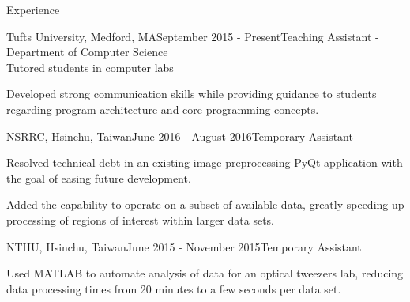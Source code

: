 \documentclass{resume} %
\begin{document}

\begin{rSection}{Experience}


\begin{rSubsection}{Tufts University, Medford, MA}{September 2015 -
    Present}{Teaching Assistant - Department of Computer Science\\
    Tutored students in computer labs}

\item Developed strong communication skills while providing guidance to
    students regarding program architecture and core programming concepts.

\end{rSubsection}

\begin{rSubsection}{NSRRC, Hsinchu, Taiwan}{June 2016 - August 2016}{Temporary
    Assistant}

\item Resolved technical debt in an existing image preprocessing PyQt
    application with the goal of easing future development.

\item Added the capability to operate on a subset of available data, greatly
    speeding up processing of regions of interest within larger data sets.

\end{rSubsection}

\begin{rSubsection}{NTHU, Hsinchu, Taiwan}{June 2015 - November
    2015}{Temporary Assistant}

\item Used MATLAB to automate analysis of data for an optical tweezers lab,
    reducing data processing times from 20 minutes to a few seconds per data
    set.

\end{rSubsection}

\smallskip

\end{rSection}
\end{document}
